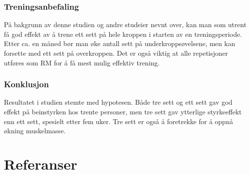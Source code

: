 \documentclass[
]{book}
\begin{document}
\hypertarget{treningsanbefaling}{%
\subsection{Treningsanbefaling}\label{treningsanbefaling}}

På bakgrunn av denne studien og andre studeier nevnt over, kan man som utrent få god effekt av å trene ett sett på hele kroppen i starten av en treningsperiode. Etter ca. en måned bør man øke antall sett på underkroppsøvelsene, men kan forsette med ett sett på overkroppen. Det er også viktig at alle repetisjoner utføres som RM for å få mest mulig effektiv trening.

\hypertarget{konklusjon}{%
\subsection{Konklusjon}\label{konklusjon}}

Resultatet i studien stemte med hypotesen. Både tre sett og ett sett gav god effekt på beinstyrken hos trente personer, men tre sett gav ytterlige styrkeeffekt enn ett sett, spesielt etter fem uker. Tre sett er også å foretrekke for å oppnå økning muskelmasse.

\hypertarget{referanser}{%
\chapter{Referanser}\label{referanser}}

  
\end{document}
